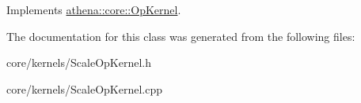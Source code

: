 Implements \mbox{\hyperlink{classathena_1_1core_1_1_op_kernel_a926afa57c90b4a999419cbbdc0496c65}{athena\+::core\+::\+Op\+Kernel}}.



The documentation for this class was generated from the following files\+:\begin{DoxyCompactItemize}
\item 
core/kernels/Scale\+Op\+Kernel.\+h\item 
core/kernels/Scale\+Op\+Kernel.\+cpp\end{DoxyCompactItemize}
